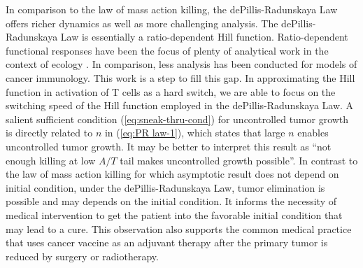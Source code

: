 \documentclass[review,authoryear]{elsarticle}
\begin{document}
In comparison to the law of mass action killing, the dePillis-Radunskaya
Law offers richer dynamics as well as more challenging analysis. The
dePillis-Radunskaya Law is essentially a ratio-dependent Hill function.
Ratio-dependent functional responses have been the focus of plenty
of analytical work in the context of ecology \citep{Abrams2000,Hsu2001,Hsu2003}.
In comparison, less analysis has been conducted for models of cancer
immunology. This work is a step to fill this gap. In approximating
the Hill function in activation of T cells as a hard switch, we are
able to focus on the switching speed of the Hill function employed
in the dePillis-Radunskaya Law. A salient sufficient condition (\ref{eq:sneak-thru-cond}) for
uncontrolled tumor growth is directly related to $n$ in (\ref{eq:PR law-1}), which states that large $n$ enables
uncontrolled tumor growth. It may be better to interpret this result as ``not
enough killing at low $A/T$ tail makes uncontrolled growth possible''.
In contrast to the law of mass action killing for which asymptotic
result does not depend on initial condition, under the dePillis-Radunskaya
Law, tumor elimination is possible and may depends on the initial
condition. It informs the necessity of medical intervention to get
the patient into the favorable initial condition that may lead to
a cure. This observation also supports the common medical practice
that uses cancer vaccine as an adjuvant therapy after the primary
tumor is reduced by surgery or radiotherapy.
\end{document}
